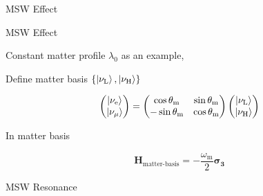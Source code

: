 \documentclass[9pt]{beamer}
\begin{document}
\begin{darkframes}
\begin{frame}{MSW Effect}
\end{frame}


\begin{frame}{MSW Effect}

Constant matter profile $\lambda_0$ as an example,

\begin{tcolorbox}[title=Significance of $\theta_{\mathrm{m}}$]

Define matter basis $\{\left| \nu_{\mathrm{L}}\right\rangle, \left| \nu_{\mathrm{H}}\right\rangle\}$

\begin{equation*}
\begin{pmatrix}
\left| \nu_{\mathrm{e}}\right\rangle \\
\left| \nu_{\mu}\right\rangle
\end{pmatrix} =
\begin{pmatrix}
\cos\theta_{\mathrm m} & \sin\theta_{\mathrm m} \\
-\sin\theta_{\mathrm m} & \cos\theta_{\mathrm m}
\end{pmatrix}\begin{pmatrix}
\left| \nu_{\mathrm{L}}\right\rangle \\
\left| \nu_{\mathrm{H}}\right\rangle
\end{pmatrix}
\end{equation*}

\end{tcolorbox}


In matter basis

\begin{equation*}
    \mathbf{H}_{\text{matter-basis}} = -\frac{\omega_{\mathrm m}}{2}\boldsymbol{\sigma_3}
\end{equation*}


\end{frame}


\begin{frame}{MSW Resonance}



\end{frame}
\end{darkframes}
\end{document}
